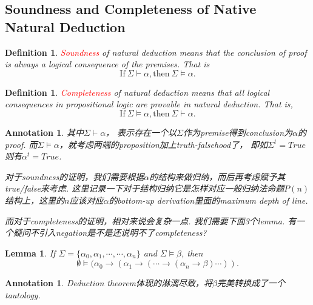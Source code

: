 \documentclass{article}
\theoremstyle{plain}
\newtheorem{lemma}[theorem]{Lemma}
\newtheorem{definition}[theorem]{Definition}
\newtheorem{annotation}[theorem]{Annotation}
\theoremstyle{nonumberplain}
\newcommand{\redt}[1]{\textcolor{red}{#1}}
\begin{document}
\newpage
\subsection{Soundness and Completeness of Native Natural Deduction}

\begin{definition}
\rm \cite{cs245-nd}\redt{Soundness} of natural deduction means that the conclusion of proof is always a logical consequence of the premises. That is
$$
\text{If}~\Sigma \vdash \alpha, \text{then}~\Sigma \vDash \alpha. 
$$ 
\end{definition}


\begin{definition}
\rm \redt{Completeness} of natural deduction means that all logical consequences in propositional logic are provable in natural deduction. That is,
$$
\text{If}~\Sigma \vDash \alpha, \text{then}~\Sigma \vdash \alpha.
$$ 
\end{definition}

\begin{annotation}
\rm 其中$\Sigma \vdash \alpha$， 表示存在一个以$\Sigma$作为premise得到conclusion为$\alpha$的proof. 而$\Sigma \vDash \alpha$，就考虑两端的proposition加上truth-falsehood了， 即如$\Sigma^t = True$则有$\alpha^t = True$.

对于soundness的证明，我们需要根据$\alpha$的结构来做归纳，而后再考虑赋予其true/false来考虑. 这里记录一下对于结构归纳它是怎样对应一般归纳法命题$P(n)$结构上，这里的$n$应该对应$\alpha$的bottom-up derivation里面的maximum depth of line. 

而对于completeness的证明，相对来说会复杂一点. 我们需要下面3个lemma. 有一个疑问不引入negation是不是还说明不了completeness?
\end{annotation}

\begin{lemma}
\rm If $\Sigma =\{\alpha_0,\alpha_1,\cdots,\cdots,\alpha_n\} $ and $\Sigma \vDash \beta$, then
$$
\emptyset \vDash (\alpha_0 \to (\alpha_1 \to (\cdots \to (\alpha_n \to \beta)\cdots)).
$$
\end{lemma}

\begin{annotation}
\rm Deduction theorem体现的淋漓尽致，将$\beta$完美转换成了一个tautology. 
\end{annotation}
\end{document}

